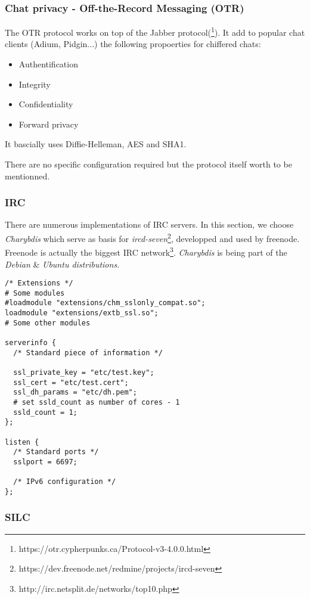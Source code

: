 \subsubsection{Chat privacy - Off-the-Record Messaging (OTR)}

The OTR protocol works on top of the Jabber protocol(\footnote{https://otr.cypherpunks.ca/Protocol-v3-4.0.0.html}).  
It add to popular chat clients (Adium, Pidgin...) the following propoerties for chiffered chats:
\begin{itemize}
    \item Authentification
    \item Integrity
    \item Confidentiality
    \item Forward privacy
\end{itemize}

It bascially uses Diffie-Helleman, AES and SHA1. 

There are no specific configuration required but the protocol itself worth to be mentionned.

\subsubsection{IRC}


There are numerous implementations of IRC servers.  In this section, we choose {\it Charybdis} which serve as basis for {\it ircd-seven}\footnote{https://dev.freenode.net/redmine/projects/ircd-seven}, developped and used by freenode. Freenode is actually the biggest IRC network\footnote{http://irc.netsplit.de/networks/top10.php}.  {\it Charybdis} is being part of the {\it Debian} & \it{Ubuntu} distributions.

\begin{lstlisting}[breaklines]
/* Extensions */
# Some modules 
#loadmodule "extensions/chm_sslonly_compat.so";
loadmodule "extensions/extb_ssl.so";
# Some other modules

serverinfo {
  /* Standard piece of information */
  
  ssl_private_key = "etc/test.key";
  ssl_cert = "etc/test.cert";
  ssl_dh_params = "etc/dh.pem";
  # set ssld_count as number of cores - 1
  ssld_count = 1; 
};

listen {
  /* Standard ports */
  sslport = 6697;

  /* IPv6 configuration */
};
\end{lstlisting}


\subsubsection{SILC}



